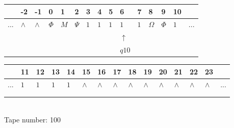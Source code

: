 \documentclass[11pt]{article}
\begin{document}
\begin{table}[H]
\centering
\begin{tabular}{lllllllllllllll}
 & -2 & -1 & 0 & 1 & 2 & 3 & 4 & 5 & 6 & 7 & 8 & 9 & 10 & \\
\hline
$...$ & \multicolumn{1}{|l|}{$\wedge$} & \multicolumn{1}{|l|}{$\wedge$} & \multicolumn{1}{|l|}{$\Phi$} & \multicolumn{1}{|l|}{$M$} & \multicolumn{1}{|l|}{$\Psi$} & \multicolumn{1}{|l|}{$1$} & \multicolumn{1}{|l|}{$1$} & \multicolumn{1}{|l|}{$1$} & \multicolumn{1}{|l|}{$1$} & \multicolumn{1}{|l|}{$1$} & \multicolumn{1}{|l|}{$\Omega$} & \multicolumn{1}{|l|}{$\Phi$} & \multicolumn{1}{|l|}{$1$} & $...$\\
\hline
&  &  &  &  &  &  &  &  & $\uparrow$ &  &  &  &  &  \\
&  &  &  &  &  &  &  &  & $ q10 $ &  &  &  &  &  \\
\end{tabular}
\begin{tabular}{lllllllllllllll}
 & 11 & 12 & 13 & 14 & 15 & 16 & 17 & 18 & 19 & 20 & 21 & 22 & 23 & \\
\hline
$...$ & \multicolumn{1}{|l|}{$1$} & \multicolumn{1}{|l|}{$1$} & \multicolumn{1}{|l|}{$1$} & \multicolumn{1}{|l|}{$1$} & \multicolumn{1}{|l|}{$\wedge$} & \multicolumn{1}{|l|}{$\wedge$} & \multicolumn{1}{|l|}{$\wedge$} & \multicolumn{1}{|l|}{$\wedge$} & \multicolumn{1}{|l|}{$\wedge$} & \multicolumn{1}{|l|}{$\wedge$} & \multicolumn{1}{|l|}{$\wedge$} & \multicolumn{1}{|l|}{$\wedge$} & \multicolumn{1}{|l|}{$\wedge$} & $...$\\
\hline
&  &  &  &  &  &  &  &  &  &  &  &  &  &  \\
&  &  &  &  &  &  &  &  &  &  &  &  &  &  \\
\end{tabular}
\\
Tape number: 100
\noindent\makebox[\linewidth]{\hdashrule{\textwidth}{1pt}{1pt}}\end{table}
\end{document}
